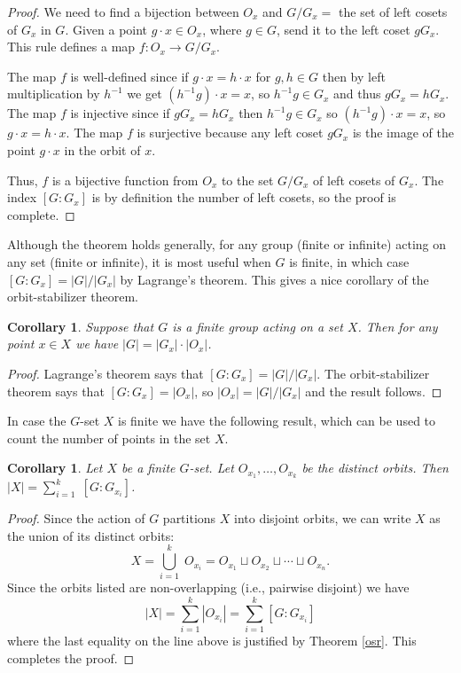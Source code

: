 \documentclass[11pt,oneside]{article}
\newtheorem{cor}[thm]{Corollary}
\theoremstyle{definition}
\begin{document}
\begin{proof}
We need to find a bijection between $O_x$ and $G/G_x =$ the set of left
cosets of $G_x$ in $G$. Given a point $g\cdot x \in O_x$, where $g
\in G$, send it to the left coset $gG_x$.  This rule defines a map $f:
O_x \to G/G_x$.

The map $f$ is well-defined since if $g\cdot x = h\cdot x$ for $g,h
\in G$ then by left multiplication by $h^{-1}$ we get $(h^{-1}g)\cdot
x = x$, so $h^{-1}g \in G_x$ and thus $gG_x=hG_x$.  The map $f$ is
injective since if $gG_x = hG_x$ then $h^{-1}g \in G_x$ so
$(h^{-1}g)\cdot x = x$, so $g\cdot x = h\cdot x$.  The map $f$ is
surjective because any left coset $gG_x$ is the image of the point
$g\cdot x$ in the orbit of $x$.

Thus, $f$ is a bijective function from $O_x$ to the set $G/G_x$ of
left cosets of $G_x$. The index $[G:G_x]$ is by definition the number
of left cosets, so the proof is complete.
\end{proof}



Although the theorem holds generally, for any group (finite or
infinite) acting on any set (finite or infinite), it is most useful
when $G$ is finite, in which case $[G:G_x]=|G|/|G_x|$ by Lagrange's
theorem. This gives a nice corollary of the orbit-stabilizer theorem.


\begin{cor}\label{countG}
  Suppose that $G$ is a finite group acting on a set $X$. Then for any
  point $x \in X$ we have $|G| = |G_x|\cdot |O_x|$.
\end{cor}

\begin{proof}
Lagrange's theorem says that $[G:G_x]=|G|/|G_x|$. The orbit-stabilizer
theorem says that $[G:G_x] = |O_x|$, so $|O_x| = |G|/|G_x|$ and the
result follows.
\end{proof}



In case the $G$-set $X$ is finite we have the following result, which
can be used to count the number of points in the set $X$.


\begin{cor} \label{orbit-union}
  Let $X$ be a finite $G$-set. Let $O_{x_1}, \dots, O_{x_k}$ be the
  distinct orbits. Then $|X| = \sum_{i=1}^k \; [G:G_{x_i}]$.
\end{cor}

\begin{proof}
Since the action of $G$ partitions $X$ into disjoint orbits, we can
write $X$ as the union of its distinct orbits:
\[
 X = \textstyle \bigcup_{i=1}^k \; O_{x_i} = O_{x_1} \sqcup O_{x_2} \sqcup
 \cdots \sqcup O_{x_n}.
\]
Since the orbits listed are non-overlapping (i.e., pairwise disjoint)
we have
\[
 |X| = \sum_{i=1}^k |O_{x_i}| = \sum_{i=1}^k [G:G_{x_i}]
\]
where the last equality on the line above is justified by Theorem
\ref{osr}. This completes the proof.
\end{proof}
\end{document}
